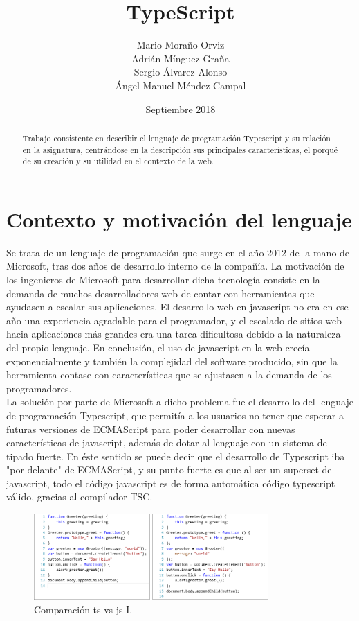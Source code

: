 \documentclass[12pt,twoside,a4paper, spanish]{article}
\begin{document}
	
	\title{TypeScript}
	\author{Mario Moraño Orviz \\
	Adrián Mínguez Graña \\
	Sergio Álvarez Alonso \\
	Ángel Manuel Méndez Campal}
	\date{Septiembre 2018}
	\maketitle
	
	\begin{abstract}
	Trabajo consistente en describir el lenguaje de programación Typescript y su relación en la asignatura, centrándose en la descripción sus principales características, el porqué de su creación y su utilidad en el contexto de la web.
	\end{abstract}

    \section{Contexto y motivación del lenguaje}
    Se trata de un lenguaje de programación que surge en el año 2012 de la mano de Microsoft, tras dos años de desarrollo interno de la compañía. La motivación de los ingenieros de Microsoft para desarrollar dicha tecnología consiste en la demanda de muchos desarrolladores web de contar con herramientas que ayudasen a escalar sus aplicaciones. El desarrollo web en javascript no era en ese año una experiencia agradable para el programador, y el escalado de sitios web hacia aplicaciones más grandes era una tarea dificultosa debido a la naturaleza del propio lenguaje. En conclusión, el uso de javascript en la web crecía exponencialmente y también la complejidad del software producido, sin que la herramienta contase con características que se ajustasen a la demanda de los programadores. \\
    
    La solución por parte de Microsoft a dicho problema fue el desarrollo del lenguaje de programación Typescript, que permitía a los usuarios no tener que esperar a futuras versiones de ECMAScript para poder desarrollar con nuevas características de javascript, además de dotar al lenguaje con un sistema de tipado fuerte. En éste sentido se puede decir que el desarrollo de Typescript iba "por delante" de ECMAScript, y su punto fuerte es que al ser un superset de javascript, todo el código javascript es de forma automática código typescript válido, gracias al compilador TSC.
    
    \begin{figure}[h]
    	\centering
    	\includegraphics[width=0.8\textwidth]{imagenes/ts3.png}
    	\caption{Comparación ts vs js I.}
    \end{figure}
\end{document}

